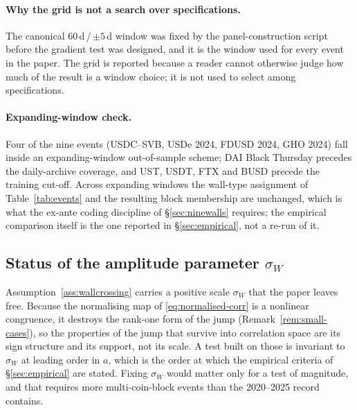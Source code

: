 \paragraph{Why the grid is not a search over specifications.} The canonical $60$\,d\,/\,$\pm5$\,d window was fixed by the panel-construction script before the gradient test was designed, and it is the window used for every event in the paper. The grid is reported because a reader cannot otherwise judge how much of the result is a window choice; it is not used to select among specifications.

\paragraph{Expanding-window check.} Four of the nine events (USDC--SVB, USDe 2024, FDUSD 2024, GHO 2024) fall inside an expanding-window out-of-sample scheme; DAI Black Thursday precedes the daily-archive coverage, and UST, USDT, FTX and BUSD precede the training cut-off. Across expanding windows the wall-type assignment of Table~\ref{tab:events} and the resulting block membership are unchanged, which is what the ex-ante coding discipline of \S\ref{sec:ninewalls} requires; the empirical comparison itself is the one reported in \S\ref{sec:empirical}, not a re-run of it.

\subsection{Status of the amplitude parameter $\sigma_W$}\label{app:oos-sigma}
Assumption~\ref{ass:wallcrossing} carries a positive scale $\sigma_W$ that the paper leaves free. Because the normalising map of \eqref{eq:normalised-corr} is a nonlinear congruence, it destroys the rank-one form of the jump (Remark~\ref{rem:small-cases}), so the properties of the jump that survive into correlation space are its sign structure and its support, not its scale. A test built on those is invariant to $\sigma_W$ at leading order in $a$, which is the order at which the empirical criteria of \S\ref{sec:empirical} are stated. Fixing $\sigma_W$ would matter only for a test of magnitude, and that requires more multi-coin-block events than the 2020--2025 record contains.

